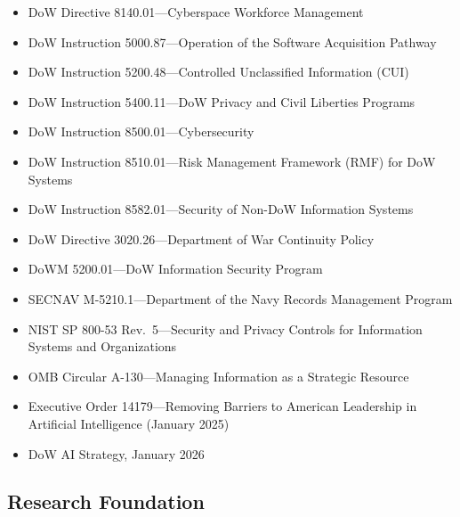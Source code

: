 \documentclass[11pt,letterpaper]{article}
\begin{document}
\begin{itemize}
  \item DoW Directive 8140.01---Cyberspace Workforce Management
  \item DoW Instruction 5000.87---Operation of the Software Acquisition Pathway
  \item DoW Instruction 5200.48---Controlled Unclassified Information (CUI)
  \item DoW Instruction 5400.11---DoW Privacy and Civil Liberties Programs
  \item DoW Instruction 8500.01---Cybersecurity
  \item DoW Instruction 8510.01---Risk Management Framework (RMF) for DoW Systems
  \item DoW Instruction 8582.01---Security of Non-DoW Information Systems
  \item DoW Directive 3020.26---Department of War Continuity Policy
  \item DoWM 5200.01---DoW Information Security Program
  \item SECNAV M-5210.1---Department of the Navy Records Management Program
  \item NIST SP 800-53 Rev.\ 5---Security and Privacy Controls for Information Systems and Organizations
  \item OMB Circular A-130---Managing Information as a Strategic Resource
  \item Executive Order 14179---Removing Barriers to American Leadership in Artificial Intelligence (January 2025)
  \item DoW AI Strategy, January 2026
\end{itemize}

\subsection{Research Foundation}
\end{document}
